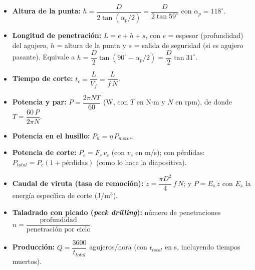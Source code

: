 \documentclass[12pt,a4paper]{article}
\begin{document}
\begin{compl}
	\begin{itemize}[nosep]
		\item \textbf{Altura de la punta:} $h = \dfrac{D}{2\tan(\alpha_p/2)} =
			      \dfrac{D}{2\tan 59^\circ}$ con $\alpha_p = 118^\circ$.
		\item \textbf{Longitud de penetración:} $L = e + h + s$, con $e$ = espesor
		      (profundidad) del agujero, $h$ = altura de la punta y $s$ = salida de
		      seguridad
		      (si es agujero pasante). Equivale a $h=\dfrac{D}{2}\tan(90^\circ -
			      \alpha_p/2) =
			      \dfrac{D}{2}\tan 31^\circ$.
		\item \textbf{Tiempo de corte:} $t_c = \dfrac{L}{V_f} = \dfrac{L}{f\,N}$.
		\item \textbf{Potencia y par:} $P = \dfrac{2\pi N T}{60}$ (W, con $T$ en
		      N$\cdot$m y $N$ en rpm), de donde $T = \dfrac{60\,P}{2\pi N}$.
		\item \textbf{Potencia en el husillo:} $P_h = \eta\, P_{motor}$.
		\item \textbf{Potencia de corte:} $P_c = F_c\, v_c$ (con $v_c$ en m/s); con
		      pérdidas: $P_{total} = P_c(1 + \text{pérdidas})$ (como lo hace la
		      diapositiva).
		\item \textbf{Caudal de viruta (tasa de remoción):} $\dot z = \dfrac{\pi
				      D^2}{4}\, f\, N$; y $P = E_s\,\dot z$ con $E_s$ la energía
		      específica de corte
		      (J/m$^3$).
		\item \textbf{Taladrado con picado (\emph{peck drilling}):} número de
		      penetraciones $n = \dfrac{\text{profundidad}}{\text{penetración por
					      ciclo}}$.
		\item \textbf{Producción:} $Q = \dfrac{3600}{t_{total}}$ agujeros/hora (con
		      $t_{total}$ en s, incluyendo tiempos muertos).
	\end{itemize}
\end{compl}
\end{document}
